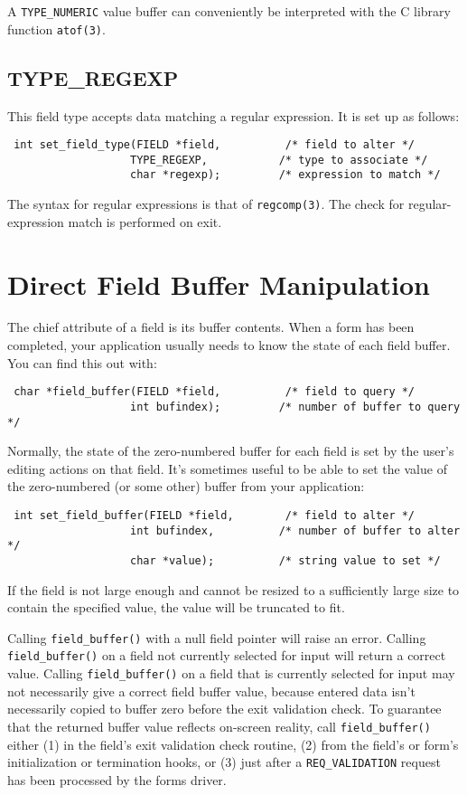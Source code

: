 A \texttt{TYPE\_NUMERIC} value buffer can conveniently be interpreted
with the C library function \texttt{atof(3)}.

\subsection{TYPE\_REGEXP}

\label{f0:ftype.regexp}This field type accepts data matching a regular expression.  It is set up
as follows:
\begin{verbatim} int set_field_type(FIELD *field,          /* field to alter */
                   TYPE_REGEXP,           /* type to associate */
                   char *regexp);         /* expression to match */
\end{verbatim}
The syntax for regular expressions is that of \texttt{regcomp(3)}.
The check for regular-expression match is performed on exit.

\section{Direct Field Buffer Manipulation}

\label{f0:fbuffer}The chief attribute of a field is its buffer contents.  When a form has
been completed, your application usually needs to know the state of each
field buffer.  You can find this out with:
\begin{verbatim} char *field_buffer(FIELD *field,          /* field to query */
                   int bufindex);         /* number of buffer to query */
\end{verbatim}
Normally, the state of the zero-numbered buffer for each field is set by
the user's editing actions on that field.  It's sometimes useful to be able
to set the value of the zero-numbered (or some other) buffer from your
application:
\begin{verbatim} int set_field_buffer(FIELD *field,        /* field to alter */
                   int bufindex,          /* number of buffer to alter */
                   char *value);          /* string value to set */
\end{verbatim}
If the field is not large enough and cannot be resized to a sufficiently
large size to contain the specified value, the value will be truncated
to fit. 

Calling \texttt{field\_buffer()} with a null field pointer will raise an
error.  Calling \texttt{field\_buffer()} on a field not currently selected
for input will return a correct value.  Calling \texttt{field\_buffer()} on a
field that is currently selected for input may not necessarily give a
correct field buffer value, because entered data isn't necessarily copied to
buffer zero before the exit validation check.
To guarantee that the returned buffer value reflects on-screen reality,
call \texttt{field\_buffer()} either (1) in the field's exit validation
check routine, (2) from the field's or form's initialization or termination
hooks, or (3) just after a \texttt{REQ\_VALIDATION} request has been processed
by the forms driver.

